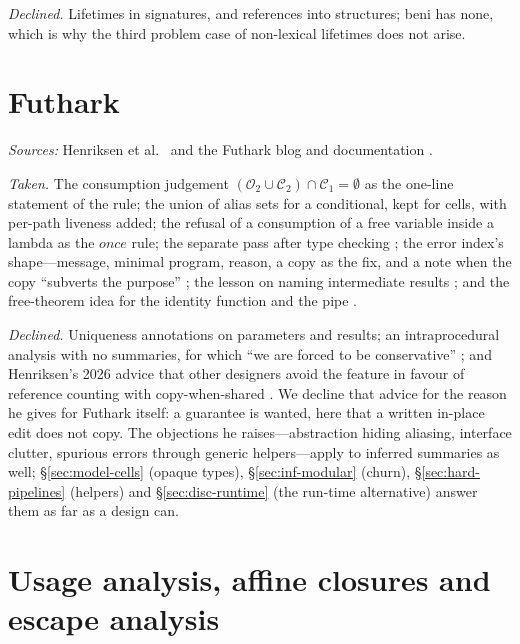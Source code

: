 \emph{Declined.} Lifetimes in signatures, and references into structures; beni has none, which is why
the third problem case of non-lexical lifetimes does not arise.

\section{Futhark}

\emph{Sources:} Henriksen et al.\ \citep{henriksen2017futhark,henriksen2017thesis} and the Futhark
blog and documentation \citep{henriksen2021anatomy,henriksen2022uniqueness,henriksen2026aliasing,henriksen2026rewrite,futhark2026errorindex}.

\emph{Taken.} The consumption judgement $(\mathcal{O}_2 \cup \mathcal{C}_2) \cap \mathcal{C}_1 = \emptyset$
\citep{henriksen2017futhark} as the one-line statement of the rule; the union of alias sets for a
conditional, kept for cells, with per-path liveness added; the refusal of a consumption of a free
variable inside a lambda \citep[\S3.3]{henriksen2017futhark} as the $\mathit{once}$ rule; the separate
pass after type checking \citep{henriksen2026rewrite}; the error index's shape---message, minimal program,
reason, a copy as the fix, and a note when the copy ``subverts the purpose''
\citep{futhark2026errorindex}; the lesson on naming intermediate results \citep{henriksen2021anatomy};
and the free-theorem idea for the identity function and the pipe \citep{henriksen2026aliasing}.

\emph{Declined.} Uniqueness annotations on parameters and results; an intraprocedural analysis with no
summaries, for which ``we are forced to be conservative'' \citep[\S3.2]{henriksen2017futhark}; and
Henriksen's 2026 advice that other designers avoid the feature in favour of reference counting with
copy-when-shared \citep{henriksen2026aliasing}. We decline that advice for the reason he gives for
Futhark itself: a guarantee is wanted, here that a written in-place edit does not copy. The objections he
raises---abstraction hiding aliasing, interface clutter, spurious errors through generic helpers---apply
to inferred summaries as well; \S\ref{sec:model-cells} (opaque types), \S\ref{sec:inf-modular} (churn),
\S\ref{sec:hard-pipelines} (helpers) and \S\ref{sec:disc-runtime} (the run-time alternative) answer
them as far as a design can.

\section{Usage analysis, affine closures and escape analysis}

